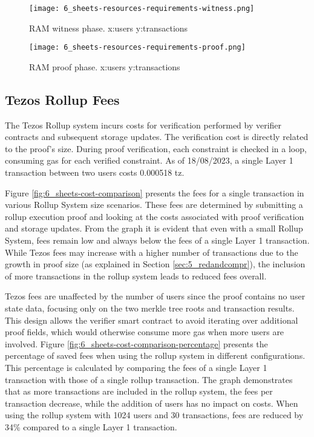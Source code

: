 \begin{figure}
	\centering
	\begin{minipage}{.5\textwidth}
		\centering
		\texttt{[image: 6\_sheets-resources-requirements-witness.png]}
		\caption[RAM Compile]{RAM witness phase. \newline x:users y:transactions}
		\label{fig:7_sheets-resources-requirements-witness.png}
	\end{minipage}%
	\begin{minipage}{.5\textwidth}
		\centering
		\texttt{[image: 6\_sheets-resources-requirements-proof.png]}
		\caption[RAM Proof]{RAM proof phase. \newline x:users y:transactions}
		\label{fig:7_sheets-resources-requirements-proof.png}
	\end{minipage}
\end{figure}

\subsection{Tezos Rollup Fees}

The Tezos Rollup system incurs costs for verification performed by verifier contracts and subsequent storage updates. The verification cost is directly related to the proof's size. During proof verification, each constraint is checked in a loop, consuming gas for each verified constraint. As of 18/08/2023, a single Layer 1 transaction between two users costs 0.000518 tz.

Figure \ref{fig:6_sheets-cost-comparison} presents the fees for a single transaction in various Rollup System size scenarios. These fees are determined by submitting a rollup execution proof and looking at the costs associated with proof verification and storage updates. From the graph it is evident that even with a small Rollup System, fees remain low and always below the fees of a single Layer 1 transaction. While Tezos fees may increase with a higher number of transactions due to the growth in proof size (as explained in Section \ref{sec:5_redandcompr}), the inclusion of more transactions in the rollup system leads to reduced fees overall.

Tezos fees are unaffected by the number of users since the proof contains no user state data, focusing only on the two merkle tree roots and transaction results. This design allows the verifier smart contract to avoid iterating over additional proof fields, which would otherwise consume more gas when more users are involved. Figure \ref{fig:6_sheets-cost-comparison-percentage} presents the percentage of saved fees when using the rollup system in different configurations. This percentage is calculated by comparing the fees of a single Layer 1 transaction with those of a single rollup transaction. The graph demonstrates that as more transactions are included in the rollup system, the fees per transaction decrease, while the addition of users has no impact on costs. When using the rollup system with 1024 users and 30 transactions, fees are reduced by 34\% compared to a single Layer 1 transaction.

